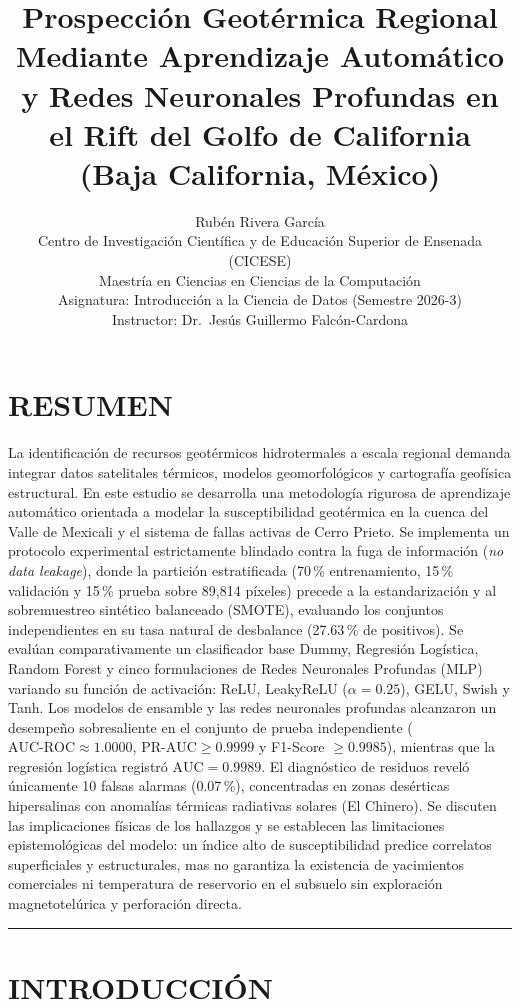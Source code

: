 \documentclass[10pt,twocolumn,letterpaper]{article}
\title{\vspace{-1.5cm}\Large\bfseries Prospección Geotérmica Regional Mediante Aprendizaje Automático y Redes Neuronales Profundas en el Rift del Golfo de California (Baja California, México)}
\author{
    \large Rubén Rivera García \\
    \normalsize Centro de Investigación Científica y de Educación Superior de Ensenada (CICESE) \\
    \normalsize Maestría en Ciencias en Ciencias de la Computación \\
    \normalsize Asignatura: Introducción a la Ciencia de Datos (Semestre 2026-3) \\
    \normalsize Instructor: Dr.\ Jesús Guillermo Falcón-Cardona
}
\date{}
\newcommand{\AUC}{\mathrm{AUC}}
\newcommand{\PRAUC}{\mathrm{PR\text{-}AUC}}
\begin{document}
\maketitle

\section*{RESUMEN}
La identificación de recursos geotérmicos hidrotermales a escala regional demanda integrar datos satelitales térmicos, modelos geomorfológicos y cartografía geofísica estructural. En este estudio se desarrolla una metodología rigurosa de aprendizaje automático orientada a modelar la susceptibilidad geotérmica en la cuenca del Valle de Mexicali y el sistema de fallas activas de Cerro Prieto. Se implementa un protocolo experimental estrictamente blindado contra la fuga de información (\emph{no data leakage}), donde la partición estratificada (70\,\% entrenamiento, 15\,\% validación y 15\,\% prueba sobre 89{,}814 píxeles) precede a la estandarización y al sobremuestreo sintético balanceado (SMOTE), evaluando los conjuntos independientes en su tasa natural de desbalance (27.63\,\% de positivos). Se evalúan comparativamente un clasificador base Dummy, Regresión Logística, Random Forest y cinco formulaciones de Redes Neuronales Profundas (MLP) variando su función de activación: ReLU, LeakyReLU ($\alpha=0.25$), GELU, Swish y Tanh. Los modelos de ensamble y las redes neuronales profundas alcanzaron un desempeño sobresaliente en el conjunto de prueba independiente ($\AUC\text{-}\mathrm{ROC} \approx 1.0000$, $\PRAUC \ge 0.9999$ y F1-Score $\ge 0.9985$), mientras que la regresión logística registró $\AUC = 0.9989$. El diagnóstico de residuos reveló únicamente 10 falsas alarmas (0.07\,\%), concentradas en zonas desérticas hipersalinas con anomalías térmicas radiativas solares (El Chinero). Se discuten las implicaciones físicas de los hallazgos y se establecen las limitaciones epistemológicas del modelo: un índice alto de susceptibilidad predice correlatos superficiales y estructurales, mas no garantiza la existencia de yacimientos comerciales ni temperatura de reservorio en el subsuelo sin exploración magnetotelúrica y perforación directa.

\vspace{0.4em}
\hrule
\vspace{0.4em}

\section{INTRODUCCIÓN}
\end{document}
